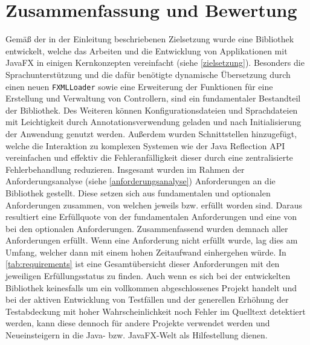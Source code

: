 \section{Zusammenfassung und Bewertung}
\label{zusammenfassung}
Gemäß der in der Einleitung beschriebenen Zielsetzung wurde eine Bibliothek entwickelt, welche das Arbeiten und die Entwicklung von Applikationen mit JavaFX in einigen Kernkonzepten vereinfacht (siehe \autoref{zielsetzung}). Besonders die Sprachunterstützung und die dafür benötigte dynamische Übersetzung durch einen neuen \texttt{FXMLLoader} sowie eine Erweiterung der Funktionen für eine Erstellung und Verwaltung von Controllern, sind ein fundamentaler Bestandteil der Bibliothek. Des Weiteren können Konfigurationsdateien und Sprachdateien mit Leichtigkeit durch Annotationsverwendung geladen und nach Initialisierung der Anwendung genutzt werden. Außerdem wurden Schnittstellen hinzugefügt, welche die Interaktion zu komplexen Systemen wie der Java Reflection API vereinfachen und effektiv die Fehleranfälligkeit dieser durch eine zentralisierte Fehlerbehandlung reduzieren. Insgesamt wurden im Rahmen der Anforderungsanalyse (siehe \autoref{anforderungsanalyse}) \thereq{} Anforderungen an die Bibliothek gestellt. Diese setzen sich aus \thereqFunAmount{} fundamentalen und \NUMBERFORMAT{\thereqOptAmount{}} optionalen Anforderungen zusammen, von welchen jeweils \thereqFunCompleted{} bzw. \NUMBERFORMAT{\thereqOptCompleted{}} erfüllt worden sind. Daraus resultiert eine Erfüllquote von \CalculatePercentage{\thereqFunCompleted}{\thereqFunAmount} der fundamentalen Anforderungen und eine von \CalculatePercentage{\thereqOptCompleted}{\thereqOptAmount} bei den optionalen Anforderungen. Zusammenfassend wurden demnach \CalculatePercentage{\thereqTotalCompleted}{\thereq} aller Anforderungen erfüllt. Wenn eine Anforderung nicht erfüllt wurde, lag dies am Umfang, welcher dann mit einem hohen Zeitaufwand einhergehen würde. In \autoref{tab:requirements} ist eine Gesamtübersicht dieser Anforderungen mit den jeweiligen Erfüllungsstatus zu finden. Auch wenn es sich bei der entwickelten Bibliothek keinesfalls um ein vollkommen abgeschlossenes Projekt handelt und bei der aktiven Entwicklung von Testfällen und der generellen Erhöhung der Testabdeckung mit hoher Wahrscheinlichkeit noch Fehler im Quelltext detektiert werden, kann diese dennoch für andere Projekte verwendet werden und Neueinsteigern in die Java- bzw. JavaFX-Welt als Hilfestellung dienen.



